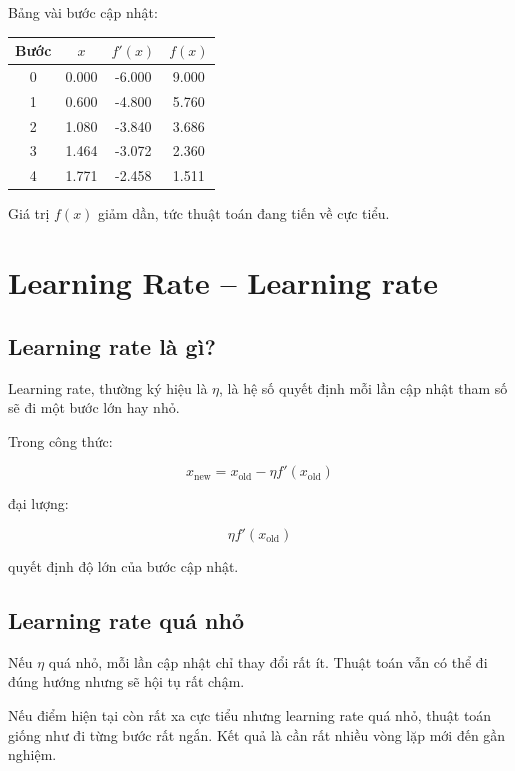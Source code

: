 \begin{vidu}
Bảng vài bước cập nhật:

\begin{center}
\begin{tabular}{cccc}
\toprule
Bước & $x$ & $f'(x)$ & $f(x)$ \\
\midrule
0 & 0.000 & -6.000 & 9.000 \\
1 & 0.600 & -4.800 & 5.760 \\
2 & 1.080 & -3.840 & 3.686 \\
3 & 1.464 & -3.072 & 2.360 \\
4 & 1.771 & -2.458 & 1.511 \\
\bottomrule
\end{tabular}
\end{center}

Giá trị $f(x)$ giảm dần, tức thuật toán đang tiến về cực tiểu.
\end{vidu}

\section{Learning Rate -- Learning rate}

\subsection{Learning rate là gì?}

Learning rate, thường ký hiệu là $\eta$, là hệ số quyết định mỗi lần cập nhật tham số sẽ đi một bước lớn hay nhỏ.

Trong công thức:

\[
    x_{\text{new}}
    =
    x_{\text{old}}
    -
    \eta f'(x_{\text{old}})
\]

đại lượng:

\[
    \eta f'(x_{\text{old}})
\]

quyết định độ lớn của bước cập nhật.

\subsection{Learning rate quá nhỏ}

Nếu $\eta$ quá nhỏ, mỗi lần cập nhật chỉ thay đổi rất ít. Thuật toán vẫn có thể đi đúng hướng nhưng sẽ hội tụ rất chậm.

\begin{vidu}
Nếu điểm hiện tại còn rất xa cực tiểu nhưng learning rate quá nhỏ, thuật toán giống như đi từng bước rất ngắn. Kết quả là cần rất nhiều vòng lặp mới đến gần nghiệm.
\end{vidu}

